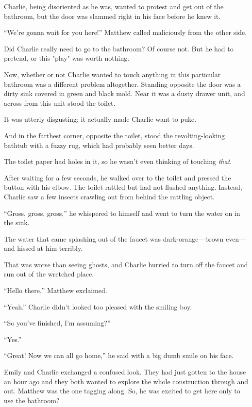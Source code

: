Charlie, being disoriented as he was, wanted to protest and get out of the bathroom, but the door was slammed right in his face before he knew it.

“We're gonna wait for you here!” Matthew called maliciously from the other side.

Did Charlie really need to go to the bathroom? Of course not. But he had to pretend, or this "play" was worth nothing.

Now, whether or not Charlie wanted to touch anything in this particular bathroom was a different problem altogether. Standing opposite the door was a dirty sink covered in green and black mold. Near it was a dusty drawer unit, and across from this unit stood the toilet.

It was utterly disgusting; it actually made Charlie want to puke.

And in the farthest corner, opposite the toilet, stood the revolting-looking bathtub with a fuzzy rug, which had probably seen better days.

The toilet paper had holes in it, so he wasn't even thinking of touching \textit{that}.

After waiting for a few seconds, he walked over to the toilet and pressed the button with his elbow. The toilet rattled but had not flushed anything. Instead, Charlie saw a few insects crawling out from behind the rattling object.

“Gross, gross, gross,” he whispered to himself and went to turn the water on in the sink.

The water that came splashing out of the faucet was dark-orange—brown even—and hissed at him terribly.

That was worse than seeing ghosts, and Charlie hurried to turn off the faucet and run out of the wretched place.

“Hello there,” Matthew exclaimed.

“Yeah.” Charlie didn't looked too pleased with the smiling boy.

“So you've finished, I'm assuming?”

“Yes.”

“Great! Now we can all go home,” he said with a big dumb smile on his face.

Emily and Charlie exchanged a confused look. They had just gotten to the house an hour ago and they both wanted to explore the whole construction through and out. Matthew was the one tagging along. So, he was excited to get here only to use the bathroom?

